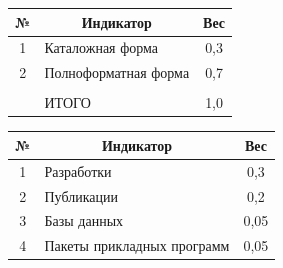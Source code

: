 \begin{table}[b]
\begin{center}
\vspace*{2ex}





\tabcolsep=17.8pt


\begin{tabular}{|c|l|c|}


\hline


№&\multicolumn{1}{c|}{Индикатор}&Вес\\


\hline


1&Каталожная форма&0,3\\


2&Полноформатная форма&0,7\\


\hline


&&\\[-10pt]


&ИТОГО&1,0\\


\hline


\end{tabular}


\end{center}


\vspace*{-12pt}




\begin{center}




\vspace*{2ex}





\tabcolsep=9.5pt


\begin{tabular}{|c|l|c|}


\hline


№&\multicolumn{1}{c|}{Индикатор}&Вес\\


\hline


1&Разработки&0,3\hphantom{9}\\


2&Публикации&0,2\hphantom{9}\\


3&Базы данных&0,05\\


4&Пакеты прикладных программ&0,05\\



\end{tabular}
\end{center}
\end{table}
